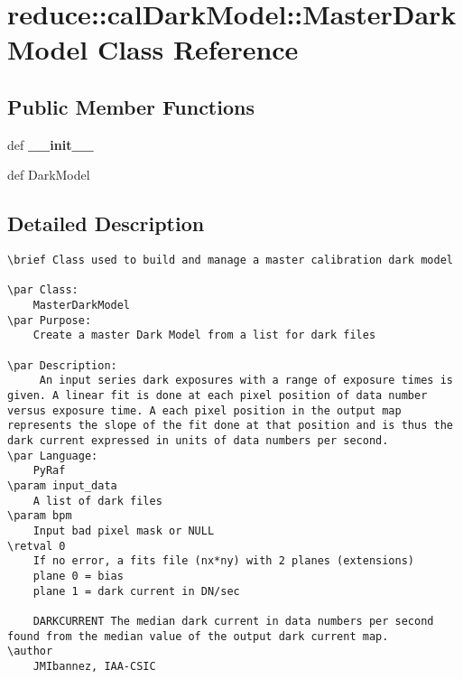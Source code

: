 \section{reduce::cal\-Dark\-Model::Master\-Dark\-Model Class Reference}
\label{classreduce_1_1calDarkModel_1_1MasterDarkModel}
\subsection*{Public Member Functions}
\begin{CompactItemize}
\item 
def \textbf{\_\-\_\-init\_\-\_\-}\label{classreduce_1_1calDarkModel_1_1MasterDarkModel_9e585748f3d00aa3327862e127f24aed}

\item 
def {\bfcreate\-Dark\-Model}
\end{CompactItemize}


\subsection{Detailed Description}


\footnotesize\begin{verbatim}
\brief Class used to build and manage a master calibration dark model

\par Class:
    MasterDarkModel
\par Purpose:
    Create a master Dark Model from a list for dark files
    
\par Description:
     An input series dark exposures with a range of exposure times is given. A linear fit is done at each pixel position of data number versus exposure time. A each pixel position in the output map represents the slope of the fit done at that position and is thus the dark current expressed in units of data numbers per second.   
\par Language:
    PyRaf
\param input_data
    A list of dark files
\param bpm
    Input bad pixel mask or NULL
\retval 0
    If no error, a fits file (nx*ny) with 2 planes (extensions)
    plane 0 = bias
    plane 1 = dark current in DN/sec
    
    DARKCURRENT The median dark current in data numbers per second found from the median value of the output dark current map.
\author
    JMIbannez, IAA-CSIC
    
\end{verbatim}
\normalsize
 



